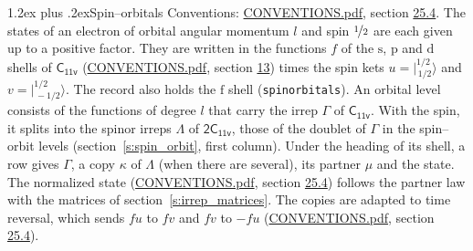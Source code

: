 \documentclass[10pt,a4paper]{article}
\makeatletter
\renewcommand\section{\@startsection{section}{1}{\z@}{-3ex plus -1ex minus -.2ex}%
  {1.2ex plus .2ex}{\normalfont\large\sffamily\bfseries\color{parttitle}}}
\numberwithin{equation}{section}
\newcommand{\grp}[1]{\mathsf{#1}}
\newcommand{\orbital}[1]{\mathrm{#1}}
\newcommand{\mult}{\kappa}
\newcommand{\intx}{\mu}
\newcommand{\jm}[2]{\bigl\lvert{}^{#1}_{\,#2}\bigr\rangle}
\makeatother
\begin{document}
\section{Spin--orbitals}\label{s:spin_orbitals}
Conventions: \href{../../CONVENTIONS.pdf}{CONVENTIONS.pdf}, section \href{../../CONVENTIONS.pdf\#conv.25.4}{25.4}.
\leavevmode\label{n:index.orbital.l}The states of an electron of orbital angular momentum $l$ and spin $\nicefrac{1}{2}$ are each given up to a positive factor. \label{n:local.spinor.uv}\label{n:local.function.f}They are written in the functions $f$ of the $\orbital{s}$, $\orbital{p}$ and $\orbital{d}$ shells of \href{../../../rotation/data/pdf/C11v.pdf}{$\grp{C_{11v}}$} (\href{../../CONVENTIONS.pdf}{CONVENTIONS.pdf}, section \href{../../../rotation/CONVENTIONS.pdf\#conv.13}{13}) times the spin kets $u = \jm{1/2}{1/2}$ and $v = \jm{1/2}{-1/2}$. The record also holds the $\orbital{f}$ shell (\texttt{spinorbitals}). An orbital level consists of the functions of degree $l$ that carry the irrep $\Gamma$ of \href{../../../rotation/data/pdf/C11v.pdf}{$\grp{C_{11v}}$}. With the spin, it splits into the spinor irreps $\Lambda$ of $\grp{2C_{11v}}$, those of the doublet of $\Gamma$ in the spin--orbit levels (section~\ref{s:spin_orbit}, first column). \label{n:head.state}Under the heading of its shell, a row gives $\Gamma$, a copy $\mult$ of $\Lambda$ (when there are several), its partner $\intx$ and the state. The normalized state (\href{../../CONVENTIONS.pdf}{CONVENTIONS.pdf}, section \href{../../CONVENTIONS.pdf\#conv.25.4}{25.4}) follows the partner law with the matrices of section~\ref{s:irrep_matrices}. The copies are adapted to time reversal, which sends $f u$ to $f v$ and $f v$ to $-f u$ (\href{../../CONVENTIONS.pdf}{CONVENTIONS.pdf}, section \href{../../CONVENTIONS.pdf\#conv.25.4}{25.4}).
\end{document}
